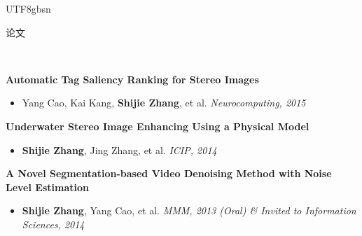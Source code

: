 \documentclass[3pt]{article}
\newenvironment{changemargin}[2]{%
  \begin{list}{}{%
    \setlength{\topsep}{0pt}%
    \setlength{\leftmargin}{#1}%
    \setlength{\rightmargin}{#2}%
    \setlength{\listparindent}{\parindent}%
    \setlength{\itemindent}{\parindent}%
    \setlength{\parsep}{\parskip}%
  }%
  \item[]}{\end{list}
}
\newcommand{\lineover}{
	\begin{changemargin}{-0.05in}{-0.05in}
		\vspace*{-8pt}
		\hrulefill \\
		\vspace*{-2pt}
	\end{changemargin}
}
\newcommand{\header}[1]{
	\begin{changemargin}{-0.5in}{-0.5in}
		{\Large \scshape{#1}}\\
  	\lineover
	\end{changemargin}
}
\newenvironment{body} {
	\vspace*{-16pt}
	\begin{changemargin}{-0.25in}{-0.5in}
  }	
	{\end{changemargin}
}
\begin{document}
\begin{CJK}{UTF8}{gbsn}
%	


 
	

\bigskip

\header{论文}

\begin{body}
	\vspace{18pt}	

	\textbf{ Automatic Tag Saliency Ranking for Stereo Images}
     \begin{itemize} \itemsep -0pt
	\item{Yang Cao, Kai Kang, \textbf{Shijie Zhang}, et al. } \hfill \emph{Neurocomputing, 2015  }
           \end{itemize}	

	\textbf{ Underwater Stereo Image Enhancing Using a Physical Model }
     \begin{itemize} \itemsep -0pt
	\item{\textbf{Shijie Zhang}, Jing Zhang, et al. } \hfill \emph{ICIP, 2014 }
           \end{itemize}	

	\textbf{ A Novel Segmentation-based Video Denoising Method with Noise Level Estimation }
     \begin{itemize} \itemsep -0pt
	\item{\textbf{Shijie Zhang}, Yang Cao, et al. } \hfill \emph{MMM, 2013 (Oral) \& Invited to Information Sciences, 2014  }
           \end{itemize}	

\end{body}

\end{CJK}
\end{document}
